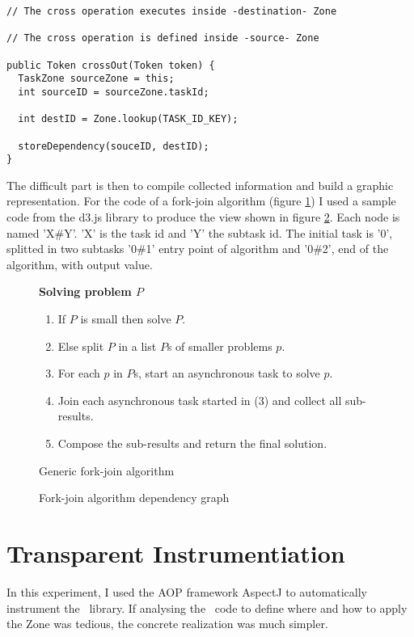 \begin{lstlisting}
// The cross operation executes inside -destination- Zone

// The cross operation is defined inside -source- Zone

public Token crossOut(Token token) {
  TaskZone sourceZone = this;
  int sourceID = sourceZone.taskId;

  int destID = Zone.lookup(TASK_ID_KEY);

  storeDependency(souceID, destID);
}
\end{lstlisting}

The difficult part is then to compile collected information and build a graphic representation. For the code of a fork-join algorithm (figure \ref{fig:fj-alg}) I used a sample code from the d3.js library to produce the view shown in figure \ref{fig:fjt-bundle}. Each node is named 'X\#Y'. 'X' is the task id and 'Y' the subtask id. The initial task is '0', splitted in two subtasks '0\#1' entry point of algorithm and '0\#2', end of the algorithm, with output value.

\begin{figure}[h]
  \textbf{Solving problem $P$}
  \begin{enumerate}
  \item If $P$ is small then solve $P$.
  \item Else split $P$ in a list $P$s of smaller problems $p$.
  \item For each $p$ in $P$s, start an asynchronous task to solve $p$.
  \item Join each asynchronous task started in (3) and collect all sub-results.
  \item Compose the sub-results and return the final solution.
  \end{enumerate}
\caption{Generic fork-join algorithm}
\label{fig:fj-alg}
\end{figure}

\begin{figure}
  \centering
  \caption{Fork-join algorithm dependency graph}
  \label{fig:fjt-bundle}
\end{figure}


\section{Transparent Instrumentiation}

In this experiment, I used the AOP framework AspectJ to automatically instrument the \vertx\ library. If analysing the \vertx\ code to define where and how to apply the Zone was tedious, the concrete realization was much simpler.


